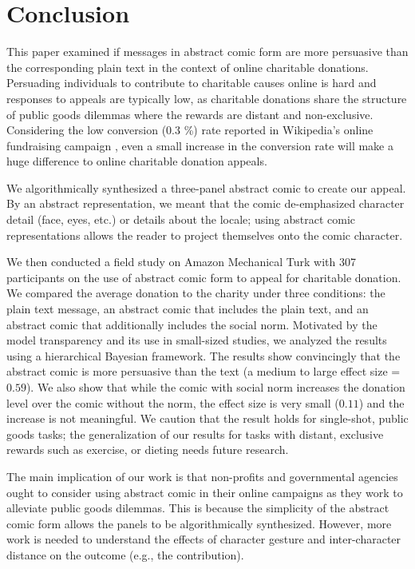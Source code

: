 \section{Conclusion}
\label{sec:Conclusion}

This paper examined if messages in abstract comic form are more persuasive than the corresponding plain text in the context of online charitable donations. Persuading individuals to contribute to charitable causes online is hard and responses to appeals are typically low, as charitable donations share the structure of public goods dilemmas where the rewards are distant and non-exclusive. Considering the low conversion (0.3 \%) rate reported in Wikipedia's online fundraising campaign \cite{wikimeta}, even a small increase in the conversion rate will make a huge difference to online charitable donation appeals. 

We algorithmically synthesized a three-panel abstract comic to create our appeal. By an abstract representation, we meant that the comic de-emphasized character detail (face, eyes, etc.) or details about the locale; using abstract comic representations allows the reader to project themselves onto the comic character. 

We then conducted a field study on Amazon Mechanical Turk with 307 participants on the use of abstract comic form to appeal for charitable donation. We compared the average donation to the charity under three conditions: the plain text message, an abstract comic that includes the plain text, and an abstract comic that additionally includes the social norm. Motivated by the model transparency and its use in small-sized studies, we analyzed the results using a hierarchical Bayesian framework. The results show convincingly that the abstract comic is more persuasive than the text (a medium to large effect size = $0.59$). We also show that while the comic with social norm increases the donation level over the comic without the norm, the effect size is very small ($0.11$) and the increase is not meaningful. We caution that the result holds for single-shot, public goods tasks; the generalization of our results for tasks with distant, exclusive rewards such as exercise, or dieting needs future research. 

The main implication of our work is that non-profits and governmental agencies ought to consider using abstract comic in their online campaigns as they work to alleviate public goods dilemmas. This is because the simplicity of the abstract comic form allows the panels to be algorithmically synthesized. However, more work is needed to understand the effects of character gesture and inter-character distance on the outcome (e.g., the contribution).


